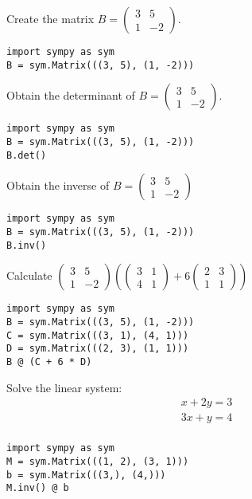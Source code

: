 \documentclass{article}
\begin{document}
\begin{multicols}{2}
    Create the matrix \(B = \begin{pmatrix} 3 & 5 \\ 1 & -2 \end{pmatrix}\).

        \begin{verbatim}
import sympy as sym
B = sym.Matrix(((3, 5), (1, -2)))
        \end{verbatim}

    Obtain the determinant of \(B = \begin{pmatrix} 3 & 5 \\ 1 & -2 \end{pmatrix}\).


        \begin{verbatim}
import sympy as sym
B = sym.Matrix(((3, 5), (1, -2)))
B.det()
        \end{verbatim}

    Obtain the inverse of \(B = \begin{pmatrix} 3 & 5 \\ 1 & -2 \end{pmatrix}\)

        \begin{verbatim}
import sympy as sym
B = sym.Matrix(((3, 5), (1, -2)))
B.inv()
        \end{verbatim}

    Calculate \(\begin{pmatrix} 3 & 5 \\ 1 & -2
        \end{pmatrix}\left(\begin{pmatrix} 3 & 1 \\ 4 & 1 \end{pmatrix} +
            6\begin{pmatrix} 2 & 3 \\ 1 & 1 \end{pmatrix} \right)\)

        \begin{verbatim}
import sympy as sym
B = sym.Matrix(((3, 5), (1, -2)))
C = sym.Matrix(((3, 1), (4, 1)))
D = sym.Matrix(((2, 3), (1, 1)))
B @ (C + 6 * D)
        \end{verbatim}

        Solve the linear system:
$$
    \begin{array}{l}
        x + 2y = 3\\
        3x + y= 4\\
    \end{array}
$$

        \begin{verbatim}
import sympy as sym
M = sym.Matrix(((1, 2), (3, 1)))
b = sym.Matrix(((3,), (4,)))
M.inv() @ b
        \end{verbatim}
\end{multicols}
\end{document}
